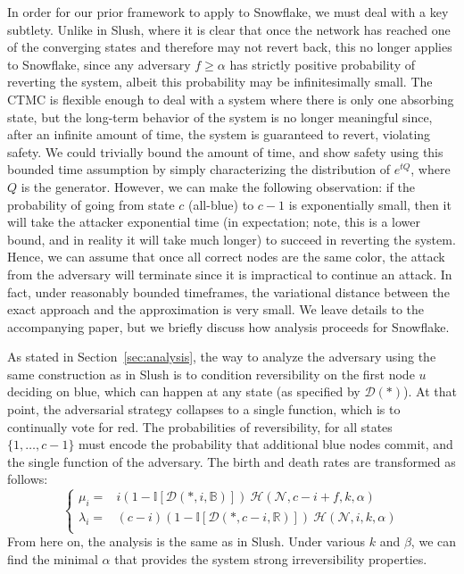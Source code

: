 \documentclass[letterpaper,twocolumn,10pt]{article}
\theoremstyle{definition}
\begin{document}
\begin{appendices}
In order for our prior framework to apply to Snowflake, we must deal with a key subtlety. 
Unlike in Slush, where it is clear that once the network has reached one of the converging states and therefore may not revert back, this no longer applies to Snowflake, since any adversary $f \geq \alpha$ has strictly positive probability of reverting the system, albeit this probability may be infinitesimally small. 
The CTMC is flexible enough to deal with a system where there is only one absorbing state, but the long-term behavior of the system is no longer meaningful since, after an infinite amount of time, the system is guaranteed to revert, violating safety. 
We could trivially bound the amount of time, and show safety using this bounded time assumption by simply characterizing the distribution of $e^{tQ}$, where $Q$ is the generator. 
However, we can make the following observation: if the probability of going from state $c$ (all-blue) to $c-1$ is exponentially small, then it will take the attacker exponential time (in expectation; note, this is a lower bound, and in reality it will take much longer) to succeed in reverting the system. 
Hence, we can assume that once all correct nodes are the same color, the attack from the adversary will terminate since it is impractical to continue an attack. 
In fact, under reasonably bounded timeframes, the variational distance between the exact approach and the approximation is very small. 
We leave details to the accompanying paper, but we briefly discuss how analysis proceeds for Snowflake. 

As stated in Section~\ref{sec:analysis}, the way to analyze the adversary using the same construction as in Slush is to condition reversibility on the first node $u$ deciding on blue, which can happen at any state (as specified by $\mathcal{D}(*)$). At that point, the adversarial strategy collapses to a single function, which is to continually vote for red. The probabilities of reversibility, for all states $\{1, \dots, c-1\}$ must encode the probability that additional blue nodes commit, and the single function of the adversary. The birth and death rates are transformed as follows:
\[
    \begin{cases}
        \mu_i = &i(1 - \mathbb{I}[\mathcal{D}(*, i, \mathbb{B})])\ \mathcal{H}(\mathcal{N}, c-i + f, k, \alpha)\\
        \lambda_i = &(c-i)(1 - \mathbb{I}[\mathcal{D}(*, c-i, \mathbb{R})])\ \mathcal{H}(\mathcal{N}, i, k, \alpha)\\
    \end{cases}
\]
From here on, the analysis is the same as in Slush. Under various $k$ and $\beta$, we can find the minimal $\alpha$ that provides the system strong irreversibility properties. 


\end{appendices}
\end{document}
